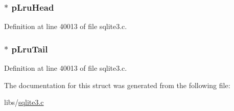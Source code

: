 \subsubsection[{p\+Lru\+Head}]{$\ast$ p\+Lru\+Head}\label{struct_p_group_ac126ae8e5a7de715e31a5a56e306c1a5}


Definition at line 40013 of file sqlite3.\+c.

\hypertarget{struct_p_group_a9e9d430cf252bc6174d4bcb769eba892}{}
\subsubsection[{p\+Lru\+Tail}]{ $\ast$ p\+Lru\+Tail}\label{struct_p_group_a9e9d430cf252bc6174d4bcb769eba892}


Definition at line 40013 of file sqlite3.\+c.



The documentation for this struct was generated from the following file\+:\begin{DoxyCompactItemize}
\item 
libs/\hyperlink{sqlite3_8c}{sqlite3.\+c}\end{DoxyCompactItemize}
